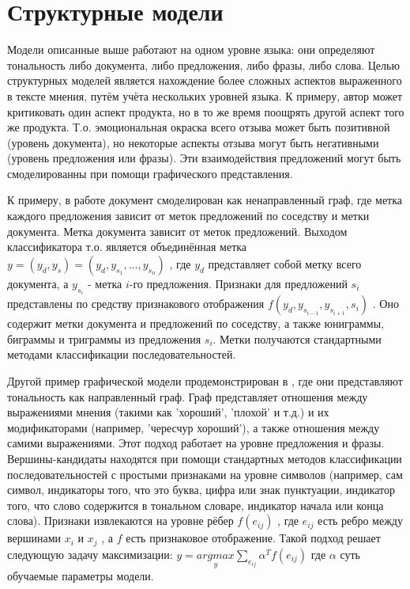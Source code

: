 \section{Структурные модели}
Модели описанные выше работают на одном уровне языка: они определяют тональность либо документа, либо предложения, либо фразы, либо слова. Целью структурных моделей является нахождение более сложных аспектов выраженного в тексте мнения, путём учёта нескольких уровней языка. К примеру, автор может критиковать один аспект продукта, но в то же время поощрять другой аспект того же продукта. Т.о. эмоциональная окраска всего отзыва может быть позитивной (уровень документа), но некоторые аспекты отзыва могут быть негативными (уровень предложения или фразы). Эти взаимодействия предложений могут быть смоделированны при помощи графического представления.
  
К примеру, в работе \cite{McDonald} документ смоделирован как ненаправленный граф, где метка каждого предложения зависит от меток предложений по соседству и метки документа. Метка документа зависит от меток предложений. Выходом классификатора т.о. является объединённая метка $y = (y_{d}, y_{s}) = (y_{d}, y_{s_{1}}, ..., y_{s_{n}})$ , где $y_{d}$ представляет собой метку всего документа, а $y_{s_{i}}$ - метка $i$-го предложения. Признаки для предложений $s_{i}$ представлены по средству признакового отображения $f(y_{d}, y_{s_{i-1}} , y_{s_{i+1}}, s_{i})$ . Оно содержит метки документа и предложений по соседству, а также юниграммы, биграммы и триграммы из предложения $s_{i}$. Метки получаются стандартными методами классификации последовательностей.

Другой пример графической модели продемонстрирован в \cite{Wu}, где они представляют тональность как направленный граф. Граф представляет отношения между выражениями мнения (такими как 'хороший', 'плохой' и т.д.) и их модификаторами (например, ’чересчур хороший'), а также отношения между самими выражениями. Этот подход работает на уровне предложения и фразы. Вершины-кандидаты находятся при помощи стандартных методов классификации последовательностей с простыми признаками на уровне символов (например, сам символ, индикаторы того, что это буква, цифра или знак пунктуации, индикатор того, что слово содержится в тональном словаре, индикатор начала или конца слова). Признаки извлекаются на уровне рёбер $f(e _{ij})$ , где $e_{ij}$ есть ребро между вершинами $x_{i}$ и $x_{j}$ , а $f$ есть признаковое отображение. Такой подход решает следующую задачу максимизации: $y = \underset{y}{argmax}\sum_{e_{ij}}\alpha^{T}f(e_{ij})$ где $\alpha$ суть обучаемые параметры модели.

